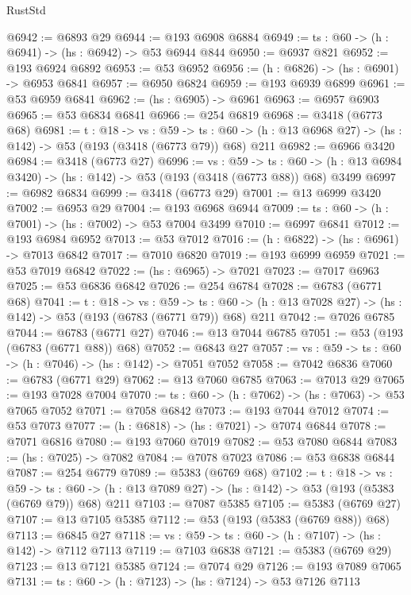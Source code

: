 \begin{lexlean}{RustStd}
\begin{coremodule}
@6942 := @6893 @29
@6944 := @193 @6908 @6884
@6949 := {ts : @60} -> (h : @6941) -> (hs : @6942) -> @53 @6944 @844
@6950 := @6937 @821
@6952 := @193 @6924 @6892
@6953 := @53 @6952
@6956 := (h : @6826) -> (hs : @6901) -> @6953 @6841
@6957 := @6950 @6824
@6959 := @193 @6939 @6899
@6961 := @53 @6959 @6841
@6962 := (hs : @6905) -> @6961
@6963 := @6957 @6903
@6965 := @53 @6834 @6841
@6966 := @254 @6819
@6968 := @3418 (@6773 @68)
@6981 := {t : @18} ->
  {vs : @59} ->
  {ts : @60} -> (h : @13 @6968 @27) -> (hs : @142) -> @53 (@193 (@3418 (@6773 @79)) @68) @211
@6982 := @6966 @3420
@6984 := @3418 (@6773 @27)
@6996 := {vs : @59} ->
  {ts : @60} -> (h : @13 @6984 @3420) -> (hs : @142) -> @53 (@193 (@3418 (@6773 @88)) @68) @3499
@6997 := @6982 @6834
@6999 := @3418 (@6773 @29)
@7001 := @13 @6999 @3420
@7002 := @6953 @29
@7004 := @193 @6968 @6944
@7009 := {ts : @60} -> (h : @7001) -> (hs : @7002) -> @53 @7004 @3499
@7010 := @6997 @6841
@7012 := @193 @6984 @6952
@7013 := @53 @7012
@7016 := (h : @6822) -> (hs : @6961) -> @7013 @6842
@7017 := @7010 @6820
@7019 := @193 @6999 @6959
@7021 := @53 @7019 @6842
@7022 := (hs : @6965) -> @7021
@7023 := @7017 @6963
@7025 := @53 @6836 @6842
@7026 := @254 @6784
@7028 := @6783 (@6771 @68)
@7041 := {t : @18} ->
  {vs : @59} ->
  {ts : @60} -> (h : @13 @7028 @27) -> (hs : @142) -> @53 (@193 (@6783 (@6771 @79)) @68) @211
@7042 := @7026 @6785
@7044 := @6783 (@6771 @27)
@7046 := @13 @7044 @6785
@7051 := @53 (@193 (@6783 (@6771 @88)) @68)
@7052 := @6843 @27
@7057 := {vs : @59} -> {ts : @60} -> (h : @7046) -> (hs : @142) -> @7051 @7052
@7058 := @7042 @6836
@7060 := @6783 (@6771 @29)
@7062 := @13 @7060 @6785
@7063 := @7013 @29
@7065 := @193 @7028 @7004
@7070 := {ts : @60} -> (h : @7062) -> (hs : @7063) -> @53 @7065 @7052
@7071 := @7058 @6842
@7073 := @193 @7044 @7012
@7074 := @53 @7073
@7077 := (h : @6818) -> (hs : @7021) -> @7074 @6844
@7078 := @7071 @6816
@7080 := @193 @7060 @7019
@7082 := @53 @7080 @6844
@7083 := (hs : @7025) -> @7082
@7084 := @7078 @7023
@7086 := @53 @6838 @6844
@7087 := @254 @6779
@7089 := @5383 (@6769 @68)
@7102 := {t : @18} ->
  {vs : @59} ->
  {ts : @60} -> (h : @13 @7089 @27) -> (hs : @142) -> @53 (@193 (@5383 (@6769 @79)) @68) @211
@7103 := @7087 @5385
@7105 := @5383 (@6769 @27)
@7107 := @13 @7105 @5385
@7112 := @53 (@193 (@5383 (@6769 @88)) @68)
@7113 := @6845 @27
@7118 := {vs : @59} -> {ts : @60} -> (h : @7107) -> (hs : @142) -> @7112 @7113
@7119 := @7103 @6838
@7121 := @5383 (@6769 @29)
@7123 := @13 @7121 @5385
@7124 := @7074 @29
@7126 := @193 @7089 @7065
@7131 := {ts : @60} -> (h : @7123) -> (hs : @7124) -> @53 @7126 @7113

\end{coremodule}
\end{lexlean}

